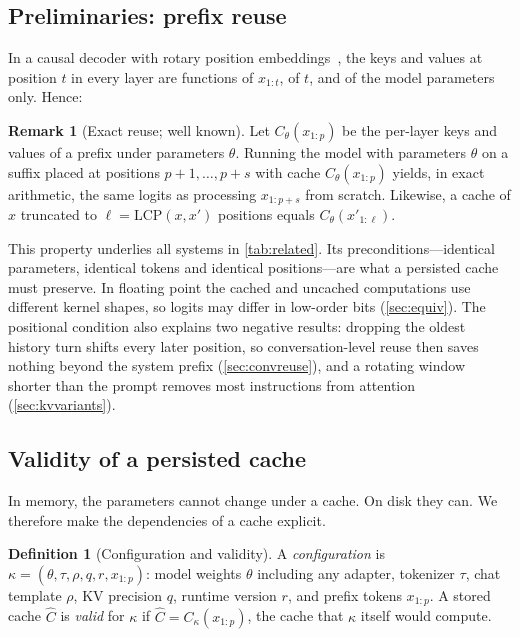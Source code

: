 \documentclass[10pt,twocolumn,letterpaper]{article}
\theoremstyle{definition}
\newtheorem{definition}{Definition}
\newtheorem{remark}{Remark}
\begin{document}
\subsection{Preliminaries: prefix reuse}\label{sec:prefix}

In a causal decoder with rotary position embeddings~\cite{su2024roformer}, the keys and values at
position $t$ in every layer are functions of $x_{1:t}$, of $t$, and of the model parameters only.
Hence:

\begin{remark}[Exact reuse; well known]\label{cor:exact}
Let $C_\theta(x_{1:p})$ be the per-layer keys and values of a prefix under parameters $\theta$.
Running the model with parameters $\theta$ on a suffix placed at positions $p+1,\dots,p+s$ with cache
$C_\theta(x_{1:p})$ yields, in exact arithmetic, the same logits as processing $x_{1:p+s}$ from
scratch. Likewise, a cache of $x$ truncated to $\ell=\mathrm{LCP}(x,x')$ positions equals
$C_\theta(x'_{1:\ell})$.
\end{remark}
\noindent This property underlies all systems in \cref{tab:related}. Its preconditions---identical
parameters, identical tokens and identical positions---are what a persisted cache must preserve. In
floating point the cached and uncached computations use different kernel shapes, so logits may
differ in low-order bits (\cref{sec:equiv}). The positional condition also explains two negative
results: dropping the oldest history turn shifts every later position, so conversation-level reuse
then saves nothing beyond the system prefix (\cref{sec:convreuse}), and a rotating window shorter
than the prompt removes most instructions from attention (\cref{sec:kvvariants}).

\subsection{Validity of a persisted cache}\label{sec:validity}

In memory, the parameters cannot change under a cache. On disk they can. We therefore make the
dependencies of a cache explicit.

\begin{definition}[Configuration and validity]
A \emph{configuration} is $\kappa=(\theta,\tau,\rho,q,r,x_{1:p})$: model weights $\theta$ including
any adapter, tokenizer $\tau$, chat template $\rho$, KV precision $q$, runtime version $r$, and prefix
tokens $x_{1:p}$. A stored cache $\hat C$ is \emph{valid} for $\kappa$ if
$\hat C=C_\kappa(x_{1:p})$, the cache that $\kappa$ itself would compute.
\end{definition}
\end{document}
